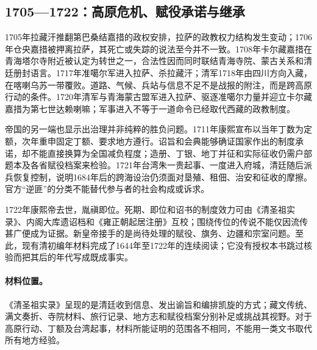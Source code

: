 \subsection{1705—1722：高原危机、赋役承诺与继承}

1705年拉藏汗推翻第巴桑结嘉措的政权安排，拉萨的政教权力结构发生变动；1706年仓央嘉措被押离拉萨，其死亡或失踪的说法至今并不一致。1708年卡尔藏嘉措在青海塔尔寺附近被认定为转世之一，合法性因而同时联结青海寺院、蒙古关系和清廷册封语言。1717年准噶尔军进入拉萨、杀拉藏汗；清军1718年由四川方向入藏，在喀喇乌苏一带覆败。道路、气候、兵站与信息不足不是战报的附注，而是跨高原行动的条件。1720年清军与青海蒙古盟军进入拉萨、驱逐准噶尔力量并迎立卡尔藏嘉措为第七世达赖喇嘛；军事进入不等于一道命令已经取代西藏的政教制度。

帝国的另一端也显示出治理并非纯粹的胜负问题。1711年康熙宣布以当年丁数为定额，次年重申固定丁额、要求地方遵行。诏旨和会典能够确证国家作出的制度承诺，却不能直接换算为全国减负程度；造册、丁银、地丁并征和实际征收仍需户部题本及各省赋役档案来检验。1721年台湾朱一贵起事、一度进入府城，清廷随后派兵恢复控制，说明1684年后的跨海设治仍须面对垦殖、租佃、治安和征收的摩擦。官方“逆匪”的分类不能替代参与者的社会构成或诉求。

1722年康熙帝去世，胤禛即位。死期、即位和诏书的制度效力可由《清圣祖实录》、内阁大库遗诏档和《雍正朝起居注册》互校；围绕传位的传说不能仅因流传甚广便成为证据。新皇帝接手的是尚待处理的赋役、旗务、边疆和宗室问题。至此，现有清初编年材料完成了1644年至1722年的连续阅读；它没有授权本书跳过核验而把其后的年代写成既成事实。

\paragraph{材料位置。} 《清圣祖实录》呈现的是清廷收到信息、发出谕旨和编排凯旋的方式；藏文传统、满文奏折、寺院材料、旅行记录、地方志和赋役档案分别补足或挑战其视野。对于高原行动、丁额及台湾起事，材料所能证明的范围各不相同，不能用一类文书取代所有地方经验。


